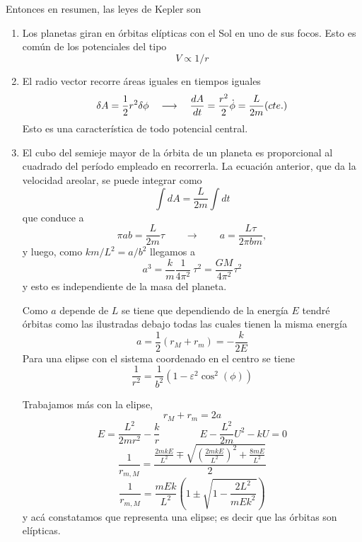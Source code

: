 \documentclass[10pt,oneside]{CBFT_book}
\begin{document}

Entonces en resumen, las leyes de Kepler son
\begin{enumerate}
 \item Los planetas giran en órbitas elípticas con el Sol en uno de sus focos. Esto es común de los potenciales del 
tipo 
	\[
		V \propto 1/r
	\]
 \item El radio vector recorre áreas iguales en tiempos iguales
	\[
		\delta A = \frac{1}{2} r^2 \delta \phi \quad \longrightarrow \quad \frac{d^{\hspace{-0.05em}} {A}}{d {t}^{\hspace{-0.05em}}} = \frac{r^2}{2} 
\dot{\phi} = \frac{L}{2m} (cte.)
	\]
	Esto es una característica de todo potencial central.
 \item El cubo del semieje mayor de la órbita de un planeta es proporcional al cuadrado del período empleado en 
recorrerla.
	La ecuación anterior, que da la velocidad areolar, se puede integrar como 
	\[
		\int dA  = \frac{L}{2m} \int dt
	\]
	que conduce a 
	\[
		\pi a b = \frac{L}{2m} \tau \qquad \longrightarrow \qquad a = \frac{L\tau}{2\pi b m}, 
	\]
	y luego, como $k m /L ^2 = a/b^2$ llegamos a 
	\[
		a^3 = \frac{k}{m} \frac{1}{4\pi^2} \: \tau^2 = \frac{GM}{4\pi^2} \tau^2
	\]
 y esto es independiente de la masa del planeta.
 
Como $a$ depende de $L$ se tiene que dependiendo de la energía $E$ tendré órbitas como las ilustradas debajo
todas las cuales tienen la misma energía 
\[
	a = \frac{1}{2}(r_M + r_m) = -\frac{k}{2E}
\] 
 Para una elipse con el sistema coordenado en el centro se tiene 
 \[
	\frac{1}{r^2} = \frac{1}{b^2}( 1-\varepsilon^2 \cos^2 (\phi) )
 \]
 
 Trabajamos más con la elipse,
 \[
	r_M + r_m = 2a
 \]
 \[
	E = \frac{L^2}{2mr^2} - \frac{k}{r}	\qquad\qquad E - \frac{L^2}{2m} U^2 - kU = 0
 \]
 \[
	\frac{1}{r_{m,M}} = \frac{ \frac{2mkE}{L^2} \mp \sqrt{ \left(\frac{2mkE}{L^2}\right)^2 + \frac{8mE}{L^2} } }{2}
 \]
 \[
	\frac{1}{r_{m,M}} = \frac{mEk}{L^2} \left( 1 \pm \sqrt{1 - \frac{2L^2}{mEk^2}}\right) 
 \]
 y acá constatamos que representa una elipse; es decir que las órbitas son elípticas.
\end{enumerate}
\end{document}
